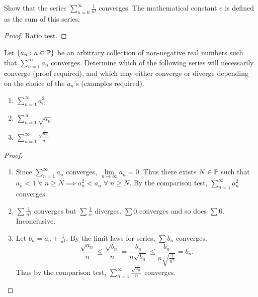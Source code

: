 \documentclass[12pt]{article}
\begin{document}
\begin{problem}
    Show that the series $\sum\limits_{n=0}^{\infty} \frac{1}{n!}$ converges.
    The mathematical constant $e$ is defined as the sum of this series.
\end{problem}
\begin{proof}
    Ratio test.
\end{proof}

\begin{problem}
    Let $\set{a_{n} : n \in \P}$ be an arbitrary collection of non-negative real numbers such that $\sum\limits_{n=1}^{\infty} a_{n}$ converges.
    Determine which of the following series will necessarily converge (proof required), and which may either converge or diverge depending on the choice of the $a_{n}$'s (examples required).
    \begin{enumerate}[label=(\alph*)]
        \item $\sum\limits_{n=1}^{\infty} a_{n}^{2}$
        \item $\sum\limits_{n=1}^{\infty} \sqrt{a_{n}}$
        \item $\sum\limits_{n=1}^{\infty} \frac{\sqrt{a_{n}}}{n}$
    \end{enumerate}
\end{problem}

\begin{proof} \leavevmode
    \begin{enumerate}[label=(\alph*)]
        \item Since $\sum_{n=1}^{\infty} a_{n}$ converges, $\lim\limits_{n \to \infty} a_{n} = 0$. Thus there exists $N \in \P$ such that $a_{n} < 1 \;\forall\; n \geq N \implies a_{n}^{2} < a_{n} \;\forall\; n \geq N$. By the comparison test, $\sum_{n=1}^{\infty} a_{n}^{2}$ converges.

        \item $\sum \frac{1}{n^{2}}$ converges but $\sum \frac{1}{n}$ diverges. $\sum 0$ converges and so does $\sum 0$. Inconclusive.

        \item Let $b_{n} = a_{n} + \frac{1}{n^{2}}$. By the limit laws for series, $\sum b_{n}$ converges. \[
            \frac{\sqrt{a_{n}}}{n} \leq \frac{\sqrt{b_{n}}}{n} = \frac{b_{n}}{n \sqrt{b_{n}}} \leq \frac{b_{n}}{n \sqrt{\frac{1}{n^{2}}}} = b_{n}.
        \] Thus by the comparison test, $\sum\limits_{n=1}^{\infty} \frac{\sqrt{a_{n}}}{n}$ converges. \qedhere
    \end{enumerate}
\end{proof}
\end{document}
